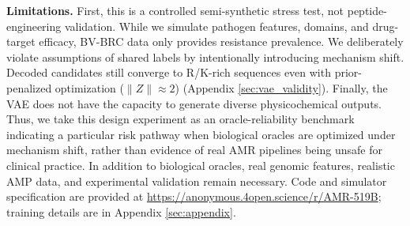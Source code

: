 \documentclass{article}
\begin{document}
\textbf{Limitations.} First, this is a controlled semi-synthetic stress test, not peptide-engineering validation. While we simulate pathogen features, domains, and drug-target efficacy, BV-BRC data only provides resistance prevalence. We deliberately violate assumptions of shared labels \cite{zhao2019learning} by intentionally introducing mechanism shift. Decoded candidates still converge to R/K-rich sequences even with prior-penalized optimization ($\|Z\| \approx 2$) (Appendix \ref{sec:vae_validity}). Finally, the VAE does not have the capacity to generate diverse physicochemical outputs. Thus, we take this design experiment as an oracle-reliability benchmark indicating a particular risk pathway when biological oracles are optimized under mechanism shift, rather than evidence of real AMR pipelines being unsafe for clinical practice. In addition to biological oracles, real genomic features, realistic AMP data, and experimental validation remain necessary. Code and simulator specification are provided at \url{https://anonymous.4open.science/r/AMR-519B}; training details are in Appendix \ref{sec:appendix}.
\end{document}

